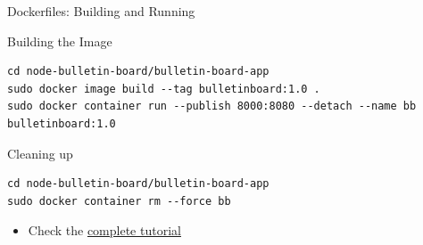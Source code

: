 \documentclass[10pt, compress, aspectratio=169, xcolor={table,usenames,dvipsnames}]{beamer}
\begin{document}
\begin{frame}[label={sec:org7323d63},fragile]{Dockerfiles: Building and Running}
 \begin{block}{Building the Image}
\lstset{language=bash,label= ,caption= ,captionpos=b,numbers=none}
\begin{lstlisting}
cd node-bulletin-board/bulletin-board-app
sudo docker image build --tag bulletinboard:1.0 .
sudo docker container run --publish 8000:8080 --detach --name bb bulletinboard:1.0
\end{lstlisting}
\end{block}

\begin{block}{Cleaning up}
\lstset{language=bash,label= ,caption= ,captionpos=b,numbers=none}
\begin{lstlisting}
cd node-bulletin-board/bulletin-board-app
sudo docker container rm --force bb
\end{lstlisting}

\begin{itemize}
\item Check the \href{https://docs.docker.com/get-started/part2/}{complete tutorial}
\end{itemize}
\end{block}
\end{frame}
\end{document}
